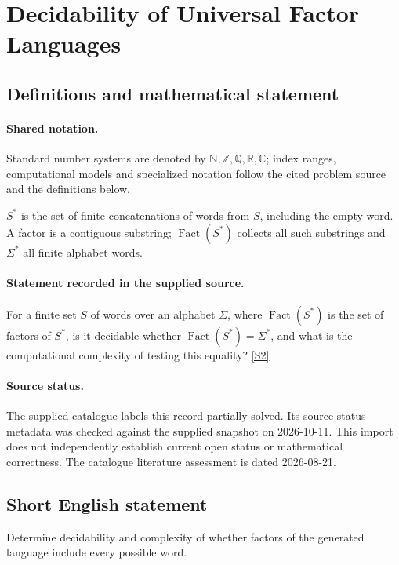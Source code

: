 \documentclass[11pt]{article}
\newcommand{\sref}[2]{\hyperlink{source:#1:#2}{[S#2]}}
\begin{document}
\section{Decidability of Universal Factor Languages}\label{statement}

\subsection{Definitions and mathematical statement}

\paragraph{Shared notation.}Standard number systems are denoted by $\mathbb N,\mathbb Z,\mathbb Q,\mathbb R,\mathbb C$; index ranges, computational models and specialized notation follow the cited problem source and the definitions below.


$S^*$ is the set of finite concatenations of words from $S$, including the empty word. A factor is a contiguous substring; $\operatorname{Fact}(S^*)$ collects all such substrings and $\Sigma^*$ all finite alphabet words.
\paragraph{Statement recorded in the supplied source.}
For a finite set $S$ of words over an alphabet $\Sigma$, where $\operatorname{Fact}(S^*)$ is the set of factors of $S^*$, is it decidable whether $\operatorname{Fact}(S^*)=\Sigma^*$, and what is the computational complexity of testing this equality? \sref{statement}{2}
\paragraph{Source status.}
The supplied catalogue labels this record partially solved. Its source-status metadata was checked against the supplied snapshot on 2026-10-11. This import does not independently establish current open status or mathematical correctness. The catalogue literature assessment is dated 2026-08-21.
\subsection{Short English statement}
Determine decidability and complexity of whether factors of the generated language include every possible word.
\end{document}
